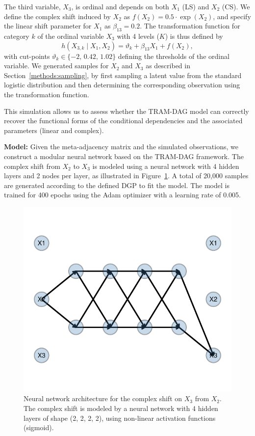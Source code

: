 The third variable, $X_3$, is ordinal and depends on both $X_1$ (LS) and $X_2$ (CS). We define the complex shift induced by $X_2$ as $f(X_2) = 0.5 \cdot \exp(X_2)$, and specify the linear shift parameter for $X_1$ as $\beta_{13} = 0.2$. The transformation function for category $k$ of the ordinal variable $X_3$ with 4 levels ($K$) is thus defined by 
\[
h(X_{3,k} \mid X_1, X_2) = \vartheta_k + \beta_{13} X_1 + f(X_2),
\]
with cut-points $\vartheta_k \in \{-2,\, 0.42,\, 1.02\}$ defining the thresholds of the ordinal variable. We generated samples for $X_2$ and $X_3$ as described in Section~\ref{methods:sampling}, by first sampling a latent value from the standard logistic distribution and then determining the corresponding observation using the transformation function.

This simulation allows us to assess whether the TRAM-DAG model can correctly recover the functional forms of the conditional dependencies and the associated parameters (linear and complex).

\medskip

\textbf{Model:} Given the meta-adjacency matrix and the simulated observations, we construct a modular neural network based on the TRAM-DAG framework. The complex shift from $X_2$ to $X_3$ is modeled using a neural network with 4 hidden layers and 2 nodes per layer, as illustrated in Figure~\ref{fig:exp1_CS}. A total of 20,000 samples are generated according to the defined DGP to fit the model. The model is trained for 400 epochs using the Adam optimizer \citep{kingma2015} with a learning rate of 0.005.



\begin{figure}[H]
\centering
\includegraphics[width=0.5\linewidth]{img/exp1_CS.pdf}
\caption{Neural network architecture for the complex shift on $X_3$ from $X_2$. The complex shift is modeled by a neural network with 4 hidden layers of shape (2, 2, 2, 2), using non-linear activation functions (sigmoid).}
\label{fig:exp1_CS}
\end{figure}




